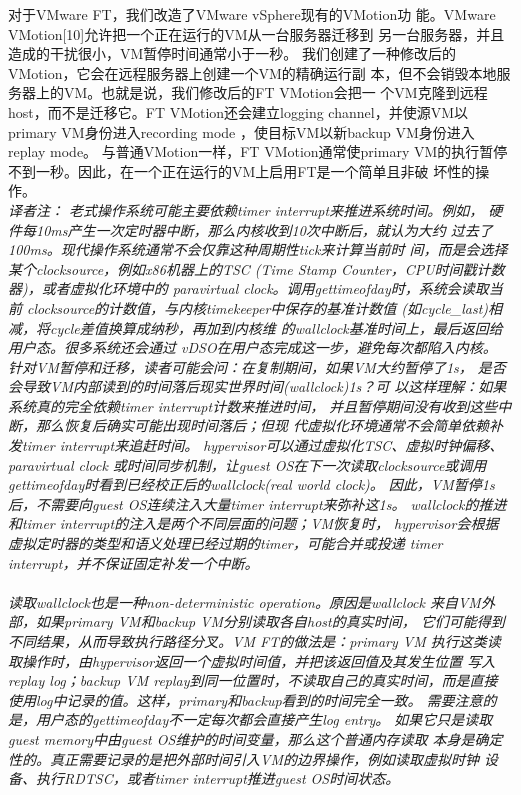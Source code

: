 对于VMware FT，我们改造了VMware vSphere现有的VMotion功%
能。VMware VMotion[10]允许把一个正在运行的VM从一台服务器迁移到%
另一台服务器，并且造成的干扰很小，VM暂停时间通常小于一秒。%
我们创建了一种修改后的VMotion，它会在远程服务器上创建一个VM的精确运行副%
本，但不会销毁本地服务器上的VM。也就是说，我们修改后的FT VMotion会把一%
个VM克隆到远程host，而不是迁移它。FT VMotion还会建立logging %
channel，并使源VM以primary VM身份进入recording mode%
，使目标VM以新backup VM身份进入replay mode。%
与普通VMotion一样，FT VMotion通常使primary VM的执行暂停%
不到一秒。因此，在一个正在运行的VM上启用FT是一个简单且非破%
坏性的操作。%
\\\emph{译者注：
老式操作系统可能主要依赖timer interrupt来推进系统时间。例如，%
硬件每10ms产生一次定时器中断，那么内核收到10次中断后，就认为大约%
过去了100ms。现代操作系统通常不会仅靠这种周期性tick来计算当前时%
间，而是会选择某个clocksource，例如x86机器上的TSC%
(Time Stamp Counter，CPU时间戳计数器)，或者虚拟化环境中的%
paravirtual clock。调用gettimeofday时，系统会读取当前%
clocksource的计数值，与内核timekeeper中保存的基准计数值%
(如cycle\_last)相减，将cycle差值换算成纳秒，再加到内核维%
的wallclock基准时间上，最后返回给用户态。很多系统还会通过%
vDSO在用户态完成这一步，避免每次都陷入内核。
\\针对VM暂停和迁移，读者可能会问：在复制期间，如果VM大约暂停了1s，%
是否会导致VM内部读到的时间落后现实世界时间(wallclock)1s？可%
以这样理解：如果系统真的完全依赖timer interrupt计数来推进时间，%
并且暂停期间没有收到这些中断，那么恢复后确实可能出现时间落后；但现%
代虚拟化环境通常不会简单依赖补发timer interrupt来追赶时间。%
hypervisor可以通过虚拟化TSC、虚拟时钟偏移、paravirtual clock%
或时间同步机制，让guest OS在下一次读取clocksource或调用%
gettimeofday时看到已经校正后的wallclock(real world clock)。%
因此，VM暂停1s后，不需要向guest OS连续注入大量timer interrupt来弥补这1s。%
wallclock的推进和timer interrupt的注入是两个不同层面的问题；VM恢复时，%
hypervisor会根据虚拟定时器的类型和语义处理已经过期的timer，可能合并或投递%
timer interrupt，并不保证固定补发一个中断。
\\\\读取wallclock也是一种non-deterministic operation。原因是wallclock
来自VM外部，如果primary VM和backup VM分别读取各自host的真实时间，
它们可能得到不同结果，从而导致执行路径分叉。VM FT的做法是：primary VM
执行这类读取操作时，由hypervisor返回一个虚拟时间值，并把该返回值及其发生位置
写入replay log；backup VM replay到同一位置时，不读取自己的真实时间，而是直接
使用log中记录的值。这样，primary和backup看到的时间完全一致。
需要注意的是，用户态的gettimeofday不一定每次都会直接产生log entry。
如果它只是读取guest memory中由guest OS维护的时间变量，那么这个普通内存读取
本身是确定性的。真正需要记录的是把外部时间引入VM的边界操作，例如读取虚拟时钟
设备、执行RDTSC，或者timer interrupt推进guest OS时间状态。}%

